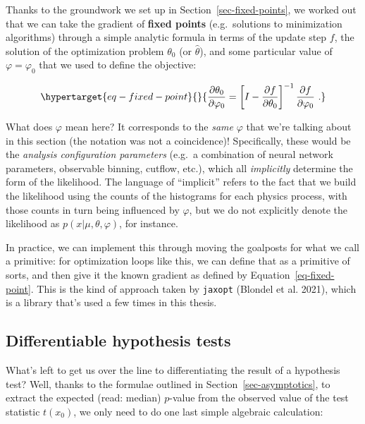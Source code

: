 \documentclass[
  11pt,
  numbers=noendperiod]{book}
\begin{document}
Thanks to the groundwork we set up in Section~\ref{sec-fixed-points}, we
worked out that we can take the gradient of \textbf{fixed points}
(e.g.~solutions to minimization algorithms) through a simple analytic
formula in terms of the update step \(f\), the solution of the
optimization problem \(\theta_0\) (or \(\hat{\theta}\)), and some
particular value of \(\varphi=\varphi_0\) that we used to define the
objective:

\begin{equation}\protect\hypertarget{eq-fixed-point}{}{
\frac{\partial\theta_0}{\partial\varphi_0}= \left[I - \frac{\partial f}{\partial \theta_0} \right]^{-1} \frac{\partial f}{\partial \varphi_0}~.
}\label{eq-fixed-point}\end{equation}

What does \(\varphi\) mean here? It corresponds to the \emph{same}
\(\varphi\) that we're talking about in this section (the notation was
not a coincidence)! Specifically, these would be the \emph{analysis
configuration parameters} (e.g.~a combination of neural network
parameters, observable binning, cutflow, etc.), which all
\emph{implicitly} determine the form of the likelihood. The language of
``implicit'' refers to the fact that we build the likelihood using the
counts of the histograms for each physics process, with those counts in
turn being influenced by \(\varphi\), but we do not explicitly denote
the likelihood as \(p(x|\mu, \theta, \varphi)\), for instance.

In practice, we can implement this through moving the goalposts for what
we call a primitive: for optimization loops like this, we can define
that as a primitive of sorts, and then give it the known gradient as
defined by Equation~\ref{eq-fixed-point}. This is the kind of approach
taken by \texttt{jaxopt} (Blondel et al. 2021), which is a library
that's used a few times in this thesis.

\hypertarget{differentiable-hypothesis-tests}{%
\subsection{Differentiable hypothesis
tests}\label{differentiable-hypothesis-tests}}

What's left to get us over the line to differentiating the result of a
hypothesis test? Well, thanks to the formulae outlined in
Section~\ref{sec-asymptotics}, to extract the expected (read: median)
\(p\)-value from the observed value of the test statistic \(t(x_0)\), we
only need to do one last simple algebraic calculation:
\end{document}
